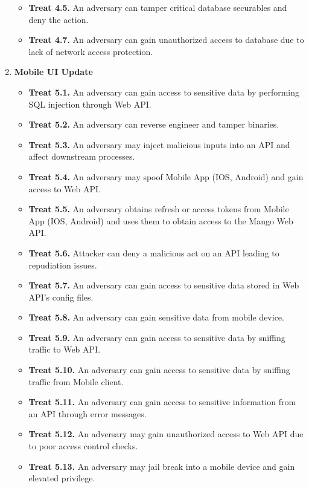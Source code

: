 \begin{enumerate}
\begin{itemize}
        \item \textbf{Treat 4.5.} An adversary can tamper critical database securables and deny the action.
        \item \textbf{Treat 4.7.} An adversary can gain unauthorized access to database due to lack of network access protection.
    \end{itemize}
    \item \textbf{Mobile UI Update}
    \begin{itemize}
        \item \textbf{Treat 5.1.} An adversary can gain access to sensitive data by performing SQL injection through Web API.
        \item \textbf{Treat 5.2.} An adversary can reverse engineer and tamper binaries.
        \item \textbf{Treat 5.3.} An adversary may inject malicious inputs into an API and affect downstream processes.
        \item \textbf{Treat 5.4.} An adversary may spoof Mobile App (IOS, Android) and gain access to Web API\@.
        \item \textbf{Treat 5.5.} An adversary obtains refresh or access tokens from Mobile App (IOS, Android) and uses them to
        obtain access to the Mango Web API\@.
        \item \textbf{Treat 5.6.} Attacker can deny a malicious act on an API leading to repudiation issues.
        \item \textbf{Treat 5.7.} An adversary can gain access to sensitive data stored in Web API's config files.
        \item \textbf{Treat 5.8.} An adversary can gain sensitive data from mobile device.
        \item \textbf{Treat 5.9.} An adversary can gain access to sensitive data by sniffing traffic to Web API\@.
        \item \textbf{Treat 5.10.} An adversary can gain access to sensitive data by sniffing traffic from Mobile client.
        \item \textbf{Treat 5.11.} An adversary can gain access to sensitive information from an API through error messages.
        \item \textbf{Treat 5.12.} An adversary may gain unauthorized access to Web API due to poor access control checks.
        \item \textbf{Treat 5.13.} An adversary may jail break into a mobile device and gain elevated privilege.
    \end{itemize}
\end{enumerate}